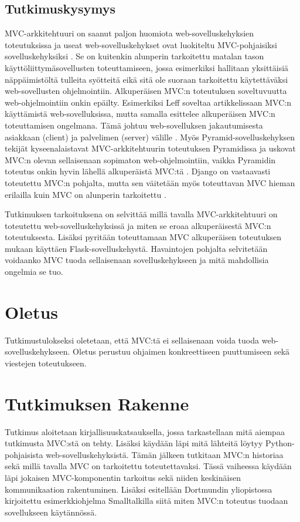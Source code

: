 \documentclass[utf8]{gradu3}
\begin{document}
\section{Tutkimuskysymys}
MVC-arkkitehtuuri on saanut paljon huomiota web-sovelluskehyksien
toteutuksissa ja useat web-sovelluskehykset ovat luokiteltu
MVC-pohjaisiksi sovelluskehyksiksi \parencite{mvcframeworks}. Se on kuitenkin alunperin
tarkoitettu matalan tason käyttöliittymäsovellusten toteuttamiseen,
jossa esimerkiksi hallitaan yksittäisiä näppäimistöltä tulleita
syötteitä eikä sitä ole suoraan tarkoitettu käytettäväksi
web-sovellusten ohjelmointiin. Alkuperäisen MVC:n toteutuksen
soveltuvuutta web-ohjelmointiin onkin epäilty. Esimerkiksi Leff
soveltaa artikkelissaan MVC:n käyttämistä web-sovelluksissa, mutta
samalla esittelee alkuperäisen MVC:n toteuttamisen ongelmana. Tämä johtuu web-sovelluksen jakautumisesta asiakkaan
(client) ja palvelimen (server) välille \parencite{ibm_watson}. Myös Pyramid-sovelluskehyksen tekijät
kyseenalaistavat MVC-arkkitehtuurin toteutuksen Pyramidissa ja uskovat
MVC:n olevan sellaisenaan sopimaton web-ohjelmointiin, vaikka
Pyramidin toteutus onkin hyvin lähellä alkuperäistä MVC:tä
\parencite{pyramid}. Django on vastaavasti toteutettu MVC:n pohjalta, mutta sen väitetään myös toteuttavan MVC hieman erilailla kuin MVC on alunperin tarkoitettu \parencite{django_mvc}.

Tutkimuksen tarkoituksena on selvittää millä tavalla
MVC-arkkitehtuuri on toteutettu web-sovelluskehyksissä ja miten se
eroaa alkuperäisestä MVC:n toteutuksesta. Lisäksi pyritään toteuttamaan MVC alkuperäisen
toteutuksen mukaan käyttäen Flask-sovelluskehystä\parencite{krasner}. Havaintojen pohjalta
selvitetään voidaanko MVC tuoda sellaisenaan sovelluskehykseen ja
mitä mahdollisia ongelmia se tuo.

\chapter{Oletus}
Tutkimustulokseksi oletetaan, että MVC:tä ei sellaisenaan voida tuoda web-sovelluskehykseen. Oletus perustuu ohjaimen
konkreettiseen puuttumiseen sekä viestejen toteutukseen.

\chapter{Tutkimuksen Rakenne}
Tutkimus aloitetaan kirjallisuuskatsauksella, jossa tarkastellaan mitä aiempaa 
tutkimusta MVC:stä on tehty. Lisäksi käydään
läpi mitä lähteitä löytyy Python-pohjaisista web-sovelluskehyksistä. Tämän jälkeen 
tutkitaan MVC:n historiaa sekä millä tavalla MVC on tarkoitettu toteutettavaksi.
Tässä vaiheessa käydään läpi jokaisen MVC-komponentin tarkoitus sekä niiden 
keskinäisen kommunikaation rakentuminen. Lisäksi esitellään
Dortmundin yliopistossa kirjoitettu esimerkkiohjelma Smalltalkilla siitä miten MVC:n 
toteutus tuodaan sovellukseen käytännössä.
\end{document}
